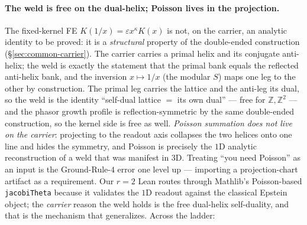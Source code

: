 \documentclass[11pt]{article}
\theoremstyle{definition}
\begin{document}
\paragraph{The weld is free on the dual-helix; Poisson lives in the projection.} The fixed-kernel
FE $K(1/x)=\varepsilon x^{\kappa}K(x)$ is not, on the carrier, an analytic identity to be proved:
it is a \emph{structural} property of the double-ended construction (\S\ref{sec:common-carrier}).
The carrier carries a primal helix and its conjugate anti-helix; the weld is exactly the statement
that the primal bank equals the reflected anti-helix bank, and the inversion $x\mapsto1/x$ (the
modular $S$) maps one leg to the other by construction. The primal leg carries the lattice and the
anti-leg its dual, so the weld is the identity ``self-dual lattice $=$ its own dual'' --- free for
$\mathbb Z,\mathbb Z^2$ --- and the phasor growth profile is reflection-symmetric by the same
double-ended construction, so the kernel side is free as well. \emph{Poisson summation does not
live on the carrier}: projecting to the readout axis collapses the two helices onto one line and
hides the symmetry, and Poisson is precisely the $1$D analytic reconstruction of a weld that was
manifest in $3$D. Treating ``you need Poisson'' as an input is the Ground-Rule-$4$ error one level
up --- importing a projection-chart artifact as a requirement. Our $r=2$ Lean routes through
Mathlib's Poisson-based \texttt{jacobiTheta} because it validates the $1$D readout against the
classical Epstein object; the \emph{carrier} reason the weld holds is the free dual-helix
self-duality, and that is the mechanism that generalizes. Across the ladder:
\end{document}
